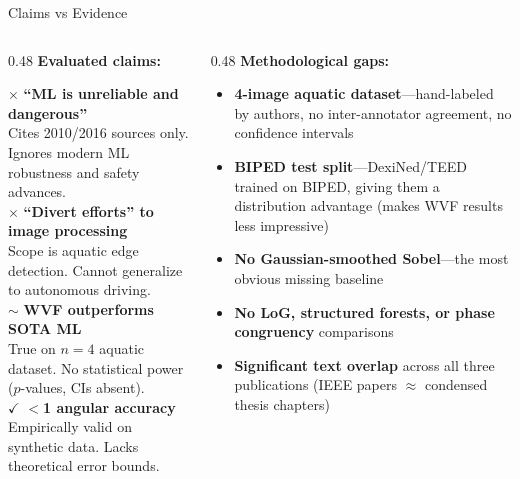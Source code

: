 \documentclass[10pt, aspectratio=169]{beamer}
\begin{document}
\begin{frame}{Claims vs Evidence}
  \begin{columns}[T]
    \begin{column}{0.48\textwidth}
      \textbf{Evaluated claims:}
      \vspace{0.3em}

      {\color{red}$\boldsymbol{\times}$} \textbf{``ML is unreliable and dangerous''}\\
      {\small Cites 2010/2016 sources only. Ignores modern ML robustness and safety advances.}\\[0.5em]

      {\color{red}$\boldsymbol{\times}$} \textbf{``Divert efforts'' to image processing}\\
      {\small Scope is aquatic edge detection. Cannot generalize to autonomous driving.}\\[0.5em]

      {\color{orange}$\boldsymbol{\sim}$} \textbf{WVF outperforms SOTA ML}\\
      {\small True on $n=4$ aquatic dataset. No statistical power ($p$-values, CIs absent).}\\[0.5em]

      {\color{green!60!black}$\boldsymbol{\checkmark}$} \textbf{$<$1\textdegree{} angular accuracy}\\
      {\small Empirically valid on synthetic data. Lacks theoretical error bounds.}
    \end{column}
    \begin{column}{0.48\textwidth}
      \textbf{Methodological gaps:}
      \vspace{0.3em}
      \begin{itemize}
        \item \textbf{4-image aquatic dataset}---hand-labeled by authors, no inter-annotator agreement, no confidence intervals
        \item \textbf{BIPED test split}---DexiNed/TEED trained on BIPED, giving them a distribution advantage (makes WVF results less impressive)
        \item \textbf{No Gaussian-smoothed Sobel}---the most obvious missing baseline
        \item \textbf{No LoG, structured forests, or phase congruency} comparisons
        \item \textbf{Significant text overlap} across all three publications (IEEE papers $\approx$ condensed thesis chapters)
      \end{itemize}
    \end{column}
  \end{columns}
\end{frame}
\end{document}
